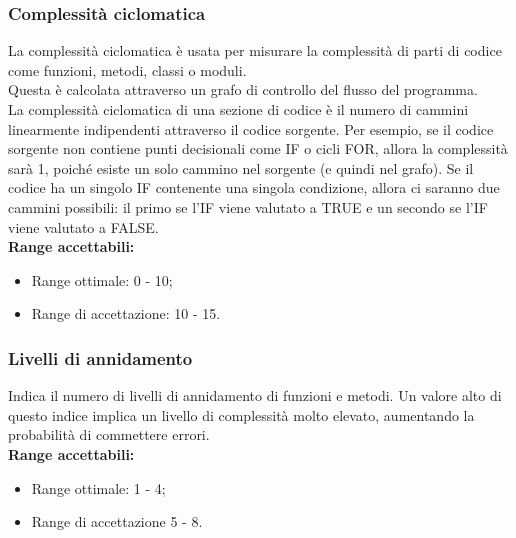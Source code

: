 \documentclass{scalatekids-article}
\begin{document}
\subsubsection{Complessità ciclomatica}
La complessità ciclomatica è usata per misurare la complessità di parti di codice come funzioni, metodi, classi o moduli.\\
Questa è calcolata attraverso un grafo di controllo del flusso del programma.\\La complessità ciclomatica di una sezione di codice è il numero di cammini linearmente indipendenti attraverso il codice sorgente. Per esempio, se il codice sorgente non contiene punti decisionali come IF o cicli FOR, allora la complessità sarà 1, poiché esiste un solo cammino nel sorgente (e quindi nel grafo). Se il codice ha un singolo IF contenente una singola condizione, allora ci saranno due cammini possibili: il primo se l'IF viene valutato a TRUE e un secondo se l'IF viene valutato a FALSE.\\
\textbf{Range accettabili:}
\begin{itemize}
  \item Range ottimale: 0 - 10;
  \item Range di accettazione: 10 - 15.
\end{itemize}
\subsubsection{Livelli di annidamento}
Indica il numero di livelli di annidamento di funzioni e metodi. Un valore alto di questo indice implica un livello di complessità molto elevato, aumentando la probabilità di commettere errori.\\
\textbf{Range accettabili:}
\begin{itemize}
  \item Range ottimale: 1 - 4;
  \item Range di accettazione 5 - 8.
\end{itemize}
\end{document}
